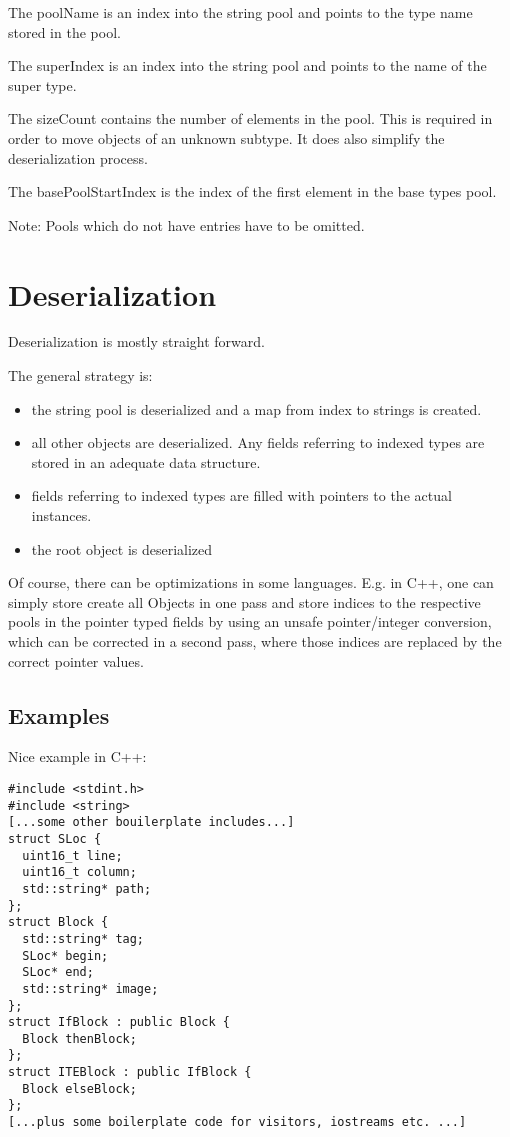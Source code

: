 \documentclass[a4paper,10pt]{article}
\begin{document}
The poolName is an index into the string pool and points to the type name stored in the pool.

The superIndex is an index into the string pool and points to the name of the super type.

The sizeCount contains the number of elements in the pool. This is required in order to move objects of an unknown subtype. It does also simplify the deserialization process.

The basePoolStartIndex is the index of the first element in the base types pool.


Note: Pools which do not have entries have to be omitted.

\section{Deserialization}

Deserialization is mostly straight forward.

The general strategy is:
\begin{itemize}
 \item the string pool is deserialized and a map from index to strings is created.
 \item all other objects are deserialized. Any fields referring to indexed types are stored in an adequate data structure.
 \item fields referring to indexed types are filled with pointers to the actual instances.
 \item the root object is deserialized
\end{itemize}

Of course, there can be optimizations in some languages. E.g. in C++, one can simply store create all Objects in one pass and store indices to the respective pools in the pointer typed fields by using an unsafe pointer/integer conversion, which can be corrected in a second pass, where those indices are replaced by the correct pointer values.


\subsection{Examples}

Nice example in C++:
\begin{verbatim}
#include <stdint.h>
#include <string>
[...some other bouilerplate includes...]
struct SLoc {
  uint16_t line;
  uint16_t column;
  std::string* path;
};
struct Block {
  std::string* tag;
  SLoc* begin;
  SLoc* end;
  std::string* image;
};
struct IfBlock : public Block {
  Block thenBlock;
};
struct ITEBlock : public IfBlock {
  Block elseBlock;
};
[...plus some boilerplate code for visitors, iostreams etc. ...]
\end{verbatim}
\end{document}
